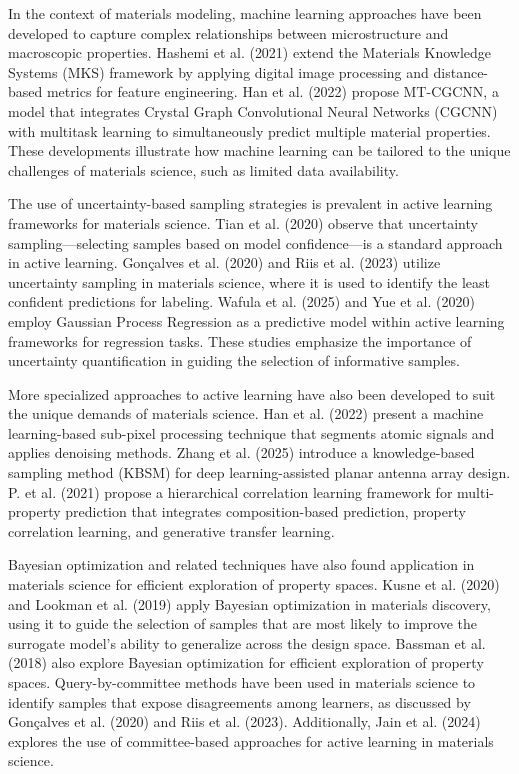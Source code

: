 In the context of materials modeling, machine learning approaches have been developed to capture complex relationships between microstructure and macroscopic properties. Hashemi et al. (2021) extend the Materials Knowledge Systems (MKS) framework by applying digital image processing and distance-based metrics for feature engineering. Han et al. (2022) propose MT-CGCNN, a model that integrates Crystal Graph Convolutional Neural Networks (CGCNN) with multitask learning to simultaneously predict multiple material properties. These developments illustrate how machine learning can be tailored to the unique challenges of materials science, such as limited data availability.

The use of uncertainty-based sampling strategies is prevalent in active learning frameworks for materials science. Tian et al. (2020) observe that uncertainty sampling---selecting samples based on model confidence---is a standard approach in active learning. Gonçalves et al. (2020) and Riis et al. (2023) utilize uncertainty sampling in materials science, where it is used to identify the least confident predictions for labeling. Wafula et al. (2025) and Yue et al. (2020) employ Gaussian Process Regression as a predictive model within active learning frameworks for regression tasks. These studies emphasize the importance of uncertainty quantification in guiding the selection of informative samples.

More specialized approaches to active learning have also been developed to suit the unique demands of materials science. Han et al. (2022) present a machine learning-based sub-pixel processing technique that segments atomic signals and applies denoising methods. Zhang et al. (2025) introduce a knowledge-based sampling method (KBSM) for deep learning-assisted planar antenna array design. P. et al. (2021) propose a hierarchical correlation learning framework for multi-property prediction that integrates composition-based prediction, property correlation learning, and generative transfer learning.

Bayesian optimization and related techniques have also found application in materials science for efficient exploration of property spaces. Kusne et al. (2020) and Lookman et al. (2019) apply Bayesian optimization in materials discovery, using it to guide the selection of samples that are most likely to improve the surrogate model's ability to generalize across the design space. Bassman et al. (2018) also explore Bayesian optimization for efficient exploration of property spaces. Query-by-committee methods have been used in materials science to identify samples that expose disagreements among learners, as discussed by Gonçalves et al. (2020) and Riis et al. (2023). Additionally, Jain et al. (2024) explores the use of committee-based approaches for active learning in materials science.


